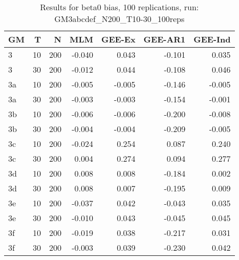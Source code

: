 \begin{table}[ht]
\centering
\begin{tabular}{lrrrrrr}
  \hline
GM & T & N & MLM & GEE-Ex & GEE-AR1 & GEE-Ind \\ 
  \hline
3 & 10 & 200 & -0.040 & 0.043 & -0.101 & 0.035 \\ 
  3 & 30 & 200 & -0.012 & 0.044 & -0.108 & 0.046 \\ 
  3a & 10 & 200 & -0.005 & -0.005 & -0.146 & -0.005 \\ 
  3a & 30 & 200 & -0.003 & -0.003 & -0.154 & -0.001 \\ 
  3b & 10 & 200 & -0.006 & -0.006 & -0.200 & -0.008 \\ 
  3b & 30 & 200 & -0.004 & -0.004 & -0.209 & -0.005 \\ 
  3c & 10 & 200 & -0.024 & 0.254 & 0.087 & 0.240 \\ 
  3c & 30 & 200 & 0.004 & 0.274 & 0.094 & 0.277 \\ 
  3d & 10 & 200 & 0.008 & 0.008 & -0.184 & 0.002 \\ 
  3d & 30 & 200 & 0.008 & 0.007 & -0.195 & 0.009 \\ 
  3e & 10 & 200 & -0.037 & 0.042 & -0.043 & 0.035 \\ 
  3e & 30 & 200 & -0.010 & 0.043 & -0.045 & 0.045 \\ 
  3f & 10 & 200 & -0.019 & 0.038 & -0.217 & 0.031 \\ 
  3f & 30 & 200 & -0.003 & 0.039 & -0.230 & 0.042 \\ 
   \hline
\end{tabular}
\caption{Results for beta0 bias, 100 replications, run: GM3abcdef_N200_T10-30_100reps} 
\label{tab:beta0_bias}
\end{table}
